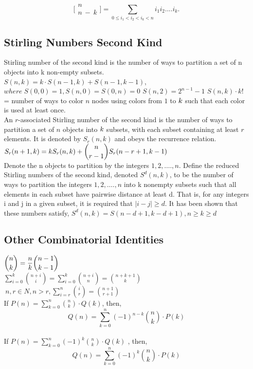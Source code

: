 \documentclass[10pt,a4paper,onesided]{article}
\begin{document}
\begin{multicols*}{2}
\[\displaystyle \bigl[\!\begin{smallmatrix} n \\ n\ -\ k \end{smallmatrix}\!\bigr] = \sum_{0 \leq i_1 < i_2 < i_k < n}{i_1i_2....i_k.}\]

\subsection{Stirling Numbers Second Kind}
Stirling number of the second kind is the number of ways to partition a set of n objects into k non-empty subsets. \\
$S(n,k)=k \cdot S(n-1,k)+S(n-1,k-1)$, \(where \; S(0,0)=1,S(n,0)=S(0,n)=0\)
$S(n,2)=2^{n-1}-1$ 
$S(n,k) \cdot k!$ = number of ways to color $n$ nodes using colors from $\displaystyle 1$ to $\displaystyle \displaystyle k$ such that each color is used at least once. \\
An $r$-associated Stirling number of the second kind is the number of ways to partition a set of $n$ objects into $\displaystyle \displaystyle k$ subsets, with each subset containing at least $r$ elements. It is denoted by $S_r( n , k )$ and obeys the recurrence relation. $\displaystyle \displaystyle S_r(n+1,k) = k S_r(n,k) + \binom{n}{r-1} S_r(n-r+1,k-1)$ \\ 
Denote the n objects to partition by the integers $\displaystyle 1, 2, …., n$. Define the reduced Stirling numbers of the second kind, denoted $S^d(n, k)$, to be the number of ways to partition the integers $\displaystyle 1, 2, …., n$ into k nonempty subsets such that all elements in each subset have pairwise distance at least d. That is, for any integers i and j in a given subset, it is required that $|i - j| \geq d$. It has been shown that these numbers satisfy, \(S^d(n, k) = S(n - d + 1, k - d + 1), n \geq k \geq d\)
\subsection{Other Combinatorial Identities}
$\displaystyle \displaystyle {n \choose k}=\frac{n}{k}{n-1 \choose k-1}$ \\
$\displaystyle \sum \limits_{i= 0}^k{n+i \choose i}= \sum \limits_{i= 0}^k{n+i \choose n} = {n+k+1 \choose k}$ \\
$\displaystyle \ n,r \in N, n > r, \sum \limits_{i=r}^n{i \choose r}={n+1 \choose r+1}$ \\
If $\displaystyle P(n)=\sum_{k=0}^{n}{n \choose k} \cdot Q(k)$, then,
\[Q(n)=\sum_{k=0}^{n}(-1)^{n-k}{n \choose k} \cdot P(k)\] \\
If $\displaystyle P(n)=\sum_{k=0}^{n}(-1)^{k}{n \choose k} \cdot Q(k)$ , then,
\[Q(n)=\sum_{k=0}^{n}(-1)^{k}{n \choose k} \cdot P(k)\]


\end{multicols*}
\end{document}
